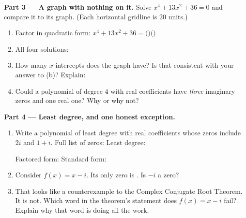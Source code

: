 \documentclass[10pt]{article}
\newcommand{\lgrid}[4]{%
  \draw[step=1, linegray!40, very thin] (#1,#3) grid (#2,#4);
  \draw[->, semithick, charcoal] (#1,0)--(#2,0) node[below right, font=\scriptsize]{$x$};
  \draw[->, semithick, charcoal] (0,#3)--(0,#4) node[left, font=\scriptsize]{$y$};}
\begin{document}
\begin{tcolorbox}[colback=white, colframe=black!40, title=\textbf{Tier E --- Extension},
    fonttitle=\bfseries, arc=1.5mm, left=3mm, right=3mm, top=2mm, bottom=2mm, breakable]
\vspace{5pt}
\textbf{Part 3 --- A graph with nothing on it.} Solve $x^4 + 13x^2 + 36 = 0$ and compare it to its
graph. (Each horizontal gridline is $20$ units.)
\begin{center}
\end{center}
\begin{enumerate}[label=(\alph*), leftmargin=1.8em, itemsep=6pt]
  \item Factor in quadratic form: $x^4+13x^2+36 = ($\blank{2.0cm}$)($\blank{2.0cm}$)$
  \item All four solutions: \blank{4.6cm}
  \item How many $x$-intercepts does the graph have? \blank{1.2cm} \; Is that consistent with your
        answer to (b)? \blank{1.2cm} \; Explain: \blank{4.6cm}
  \item Could a polynomial of degree $4$ with real coefficients have \emph{three} imaginary zeros and
        one real one? \blank{1.0cm} \; Why or why not? \writeline
\end{enumerate}

\vspace{5pt}
\textbf{Part 4 --- Least degree, and one honest exception.}
\begin{enumerate}[label=(\alph*), leftmargin=1.8em, itemsep=6pt]
  \item Write a polynomial of least degree with real coefficients whose zeros include $2i$ and
        $1+i$. \; Full list of zeros: \blank{4.4cm} \; Least degree: \blank{1.0cm}

        \vspace{2pt}
        Factored form: \blank{4.6cm} \; Standard form: \blank{5.0cm}
  \item Consider $f(x) = x - i$. \; Its only zero is \blank{1.0cm}. \; Is $-i$ a zero?
        \blank{1.0cm}
  \item That looks like a counterexample to the Complex Conjugate Root Theorem. It is not. Which
        word in the theorem's statement does $f(x)=x-i$ fail? \blank{3.0cm} \; Explain why that
        word is doing all the work. 
\end{enumerate}
\end{tcolorbox}
\end{document}
